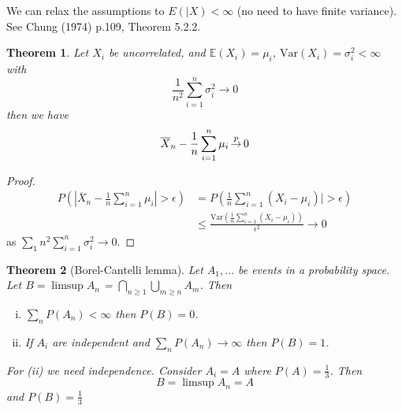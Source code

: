 \documentclass[10pt, oneside, reqno]{amsart}
\theoremstyle{plain}%
\newtheorem{thm}{Theorem}[section]
\theoremstyle{definition}
\theoremstyle{remark}
\newcommand{\var}{\text{Var}}
\newcommand{\E}{\mathbb{E}}
\def\cip{\,{\buildrel p \over \rightarrow}\,}
\begin{document}
We can relax the assumptions to $E(|X) < \infty$ (no need to have finite variance).  See Chung (1974) p.109, Theorem 5.2.2.

\begin{thm}
    Let $X_i$ be uncorrelated, and $\E(X_i) = \mu_i$, $\var(X_i) = \sigma^2_i < \infty$ with \[
        \frac{1}{n^2} \sum_{i=1}^n \sigma^2_i \rightarrow 0
    \]  then we have \[
        \overline{X}_n - \frac{1}{n} \sum_{i=1}^n \mu_i \cip 0
    \]
\end{thm}
\begin{proof}
    \begin{align*} P(|\overline{X}_n - \frac{1}{n} \sum_{i=1}^n \mu_i | > \epsilon) &= P( \frac{1}{n} \sum_{i=1}^n (X_i - \mu_i)| > \epsilon) \\
        &\leq \frac{\var(\frac{1}{n}\sum_{i=1}^n (X_i - \mu_i))}{\epsilon^2} \rightarrow 0      
    \end{align*} as $\sum_{1}{n^2} \sum_{i=1}^n \sigma_i^2 \rightarrow 0$.  
\end{proof} 


\begin{thm}[Borel-Cantelli lemma]
    Let $A_1, \dots$ be events in a probability space.  Let $B = \limsup A_n$ = $\bigcap_{n \geq 1} \bigcup_{m \geq n} A_m$.  Then 
    \begin{enumerate}[(i)]
        \item $\sum_{n} P(A_n) < \infty$ then $P(B) = 0$.  
        \item If $A_i$ are independent and $\sum_n P(A_n) \rightarrow \infty$ then $P(B) = 1$.
    \end{enumerate}
    For (ii) we need independence. Consider $A_i = A$ where $P(A) = \frac{1}{3}$.  Then \[
        B = \limsup A_n = A
    \] and $P(B) = \frac{1}{3}$
\end{thm}
\end{document}
